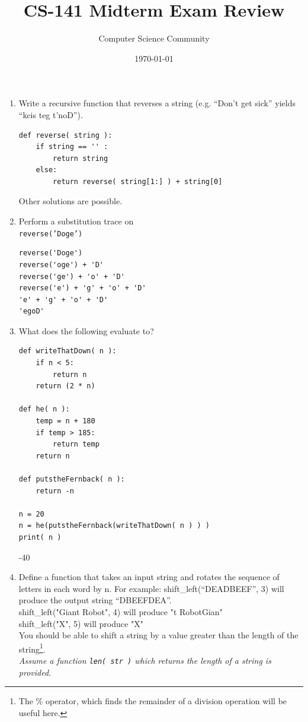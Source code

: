 \documentclass[11pt]{article}
\title{CS-141 Midterm Exam Review}
\author{Computer Science Community}
\date{\today}
\newenvironment{answer}{\large\lstset{basicstyle=\tiny}\color{white}}{}
\newenvironment{answer}{\large\lstset{basicstyle=\large}\color{red}}{}
\begin{document}
\header

\begin{enumerate}
    \item\label{reverse()} Write a recursive function that reverses a string (e.g. ``Don't
        get sick'' yields ``kcis teg t'noD'').

\begin{answer}
\begin{lstlisting}
def reverse( string ):
    if string == '' :
        return string
    else:
        return reverse( string[1:] ) + string[0]
\end{lstlisting}
Other solutions are possible.
\end{answer}

    \item Perform a substitution trace on \\
    \texttt{reverse('Doge')}

\begin{answer}
\begin{lstlisting}
reverse('Doge')
reverse('oge') + 'D'
reverse('ge') + 'o' + 'D'
reverse('e') + 'g' + 'o' + 'D'
'e' + 'g' + 'o' + 'D'
'egoD'
\end{lstlisting}
\end{answer}

 \item What does the following evaluate to?
    \begin{lstlisting}
def writeThatDown( n ):
    if n < 5:
        return n
    return (2 * n)

def he( n ):
    temp = n + 180
    if temp > 185:
        return temp
    return n

def putstheFernback( n ):
    return -n

n = 20
n = he(putstheFernback(writeThatDown( n ) ) )
print( n )
    \end{lstlisting}
    \begin{answer}
        -40
    \end{answer}

\pagebreak
    \item Define a function that takes an input string and rotates the sequence
        of letters in each word by n. For example: shift\_left(``DEADBEEF'', 3)
        will produce the output string ``DBEEFDEA''. \\ shift\_left("Giant Robot", 4) will produce "t RobotGian"\\ 
        shift\_left("X", 5) will produce "X" \\You should be able to
        shift a string by a value greater than the length of the
        string\footnote{The \% operator, which finds the remainder of a
        division operation will be useful here.}.\\ 
        \emph{Assume a function \texttt{len( str )} which returns the length of a string is provided.}



\end{enumerate}
\end{document}
